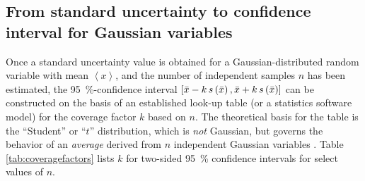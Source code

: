 %
%




\subsection{From standard uncertainty to confidence interval for Gaussian variables}\label{sec:conf_int}

Once a standard uncertainty value is obtained for a Gaussian-distributed random variable with mean $\left< x \right>$, and the number of independent samples $n$ has been estimated, the 95~\%-confidence interval $\left[ \bar{x} -k \, s\left( \bar{x} \right) , \bar{x} +k \, s\left( \bar{x} \right) \right]$ can be constructed on the basis of an established look-up table (or a statistics software model) for the coverage factor $k$ based on $n$.  The theoretical basis for the table is the ``Student'' or ``$t$'' distribution, which is \emph{not} Gaussian, but governs the behavior of an \emph{average} derived from $n$ independent Gaussian variables  \cite{JCGM:GUM2008}. Table \ref{tab:coveragefactors} lists $k$ for two-sided 95~\% confidence intervals for select values of $n$.

